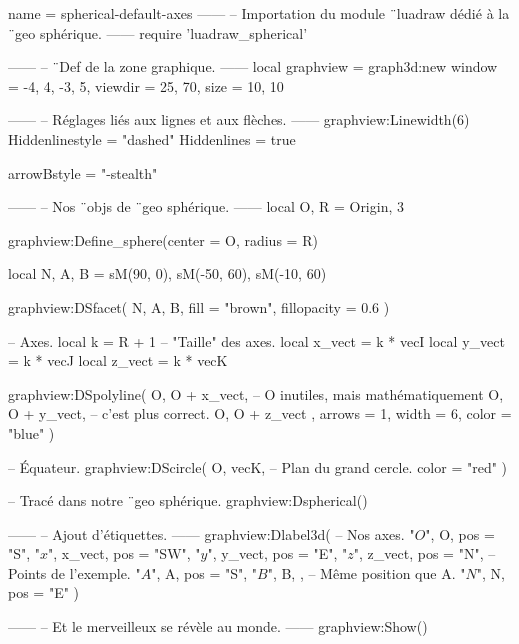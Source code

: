 \documentclass{standalone}
\begin{document}
\begin{luadraw}{name = spherical-default-axes}
------
-- Importation du module ¨luadraw dédié à la ¨geo sphérique.
------
require 'luadraw_spherical'

------
-- ¨Def de la zone graphique.
------
local graphview = graph3d:new{
  window  = {-4, 4, -3, 5},
  viewdir = {25, 70},
  size    = {10, 10}
}

------
-- Réglages liés aux lignes et aux flèches.
------
graphview:Linewidth(6)
Hiddenlinestyle = "dashed"
Hiddenlines     = true

arrowBstyle = "-stealth"

------
-- Nos ¨objs de ¨geo sphérique.
------
local O, R = Origin, 3

graphview:Define_sphere({center = O, radius = R})

local N, A, B = sM(90, 0), sM(-50, 60), sM(-10, 60)

graphview:DSfacet(
  {N, A, B},
  {fill = "brown", fillopacity = 0.6}
)

-- Axes.
local k      = R + 1     -- "Taille" des axes.
local x_vect = k * vecI
local y_vect = k * vecJ
local z_vect = k * vecK

graphview:DSpolyline(
  {
    {O, O + x_vect},  -- O inutiles, mais mathématiquement
    {O, O + y_vect},  -- c'est plus correct.
    {O, O + z_vect}
  },
  {arrows = 1, width = 6, color = "blue"}
)

-- Équateur.
graphview:DScircle(
  {O, vecK},       -- Plan du grand cercle.
  {color = "red"}
)

-- Tracé dans notre ¨geo sphérique.
graphview:Dspherical()

------
-- Ajout d'étiquettes.
------
graphview:Dlabel3d(
-- Nos axes.
  "$O$", O, {pos = "S"},
  "$x$", x_vect, {pos = "SW"},
  "$y$", y_vect, {pos = "E"},
  "$z$", z_vect, {pos = "N"},
-- Points de l'exemple.
  "$A$", A, {pos = "S"},
  "$B$", B, {},           -- Même position que A.
  "$N$", N, {pos = "E"}
)

------
-- Et le merveilleux se révèle au monde.
------
graphview:Show()
\end{luadraw}
\end{document}
